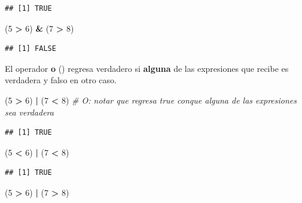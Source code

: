 \documentclass[]{book}
\newenvironment{Shaded}{\begin{snugshade}}{\end{snugshade}}
\newcommand{\DecValTok}[1]{\textcolor[rgb]{0.00,0.00,0.81}{#1}}
\newcommand{\StringTok}[1]{\textcolor[rgb]{0.31,0.60,0.02}{#1}}
\newcommand{\CommentTok}[1]{\textcolor[rgb]{0.56,0.35,0.01}{\textit{#1}}}
\newcommand{\OperatorTok}[1]{\textcolor[rgb]{0.81,0.36,0.00}{\textbf{#1}}}
\newcommand{\NormalTok}[1]{#1}
\theoremstyle{definition}
\theoremstyle{definition}
\theoremstyle{definition}
\theoremstyle{remark}
\begin{document}
\begin{verbatim}
## [1] TRUE
\end{verbatim}

\begin{Shaded}
\begin{Highlighting}[]
\NormalTok{(}\DecValTok{5} \OperatorTok{>}\StringTok{ }\DecValTok{6}\NormalTok{) }\OperatorTok{&}\StringTok{ }\NormalTok{(}\DecValTok{7} \OperatorTok{>}\StringTok{ }\DecValTok{8}\NormalTok{)}
\end{Highlighting}
\end{Shaded}

\begin{verbatim}
## [1] FALSE
\end{verbatim}

El operador \textbf{o} (\textbar{}) regresa verdadero si \textbf{alguna}
de las expresiones que recibe es verdadera y falso en otro caso.

\begin{Shaded}
\begin{Highlighting}[]
\NormalTok{(}\DecValTok{5} \OperatorTok{>}\StringTok{ }\DecValTok{6}\NormalTok{) }\OperatorTok{|}\StringTok{ }\NormalTok{(}\DecValTok{7} \OperatorTok{<}\StringTok{ }\DecValTok{8}\NormalTok{) }\CommentTok{# O: notar que regresa true conque alguna de las expresiones sea verdadera}
\end{Highlighting}
\end{Shaded}

\begin{verbatim}
## [1] TRUE
\end{verbatim}

\begin{Shaded}
\begin{Highlighting}[]
\NormalTok{(}\DecValTok{5} \OperatorTok{<}\StringTok{ }\DecValTok{6}\NormalTok{) }\OperatorTok{|}\StringTok{ }\NormalTok{(}\DecValTok{7} \OperatorTok{<}\StringTok{ }\DecValTok{8}\NormalTok{)}
\end{Highlighting}
\end{Shaded}

\begin{verbatim}
## [1] TRUE
\end{verbatim}

\begin{Shaded}
\begin{Highlighting}[]
\NormalTok{(}\DecValTok{5} \OperatorTok{>}\StringTok{ }\DecValTok{6}\NormalTok{) }\OperatorTok{|}\StringTok{ }\NormalTok{(}\DecValTok{7} \OperatorTok{>}\StringTok{ }\DecValTok{8}\NormalTok{)}
\end{Highlighting}
\end{Shaded}
\end{document}
